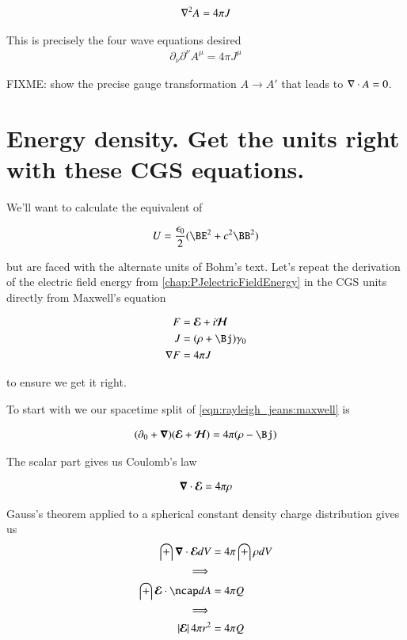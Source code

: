 \begin{align*}
\nabla^2 A = 4 \pi J
\end{align*}

This is precisely the four wave equations desired
\begin{align*}
\partial_\nu\partial^\nu A^\mu = 4 \pi J^\mu
\end{align*}

FIXME: show the precise gauge transformation $A \rightarrow A'$ that leads to $\nabla \cdot A = 0$.

\section{Energy density.  Get the units right with these CGS equations. }

We'll want to calculate the equivalent of 

\begin{align*}
U = \frac{\epsilon_0}{2} (\BE^2 + c^2 \BB^2)
\end{align*}

but are faced with the alternate units of Bohm's text.  Let's repeat the
derivation of the electric field energy from \ref{chap:PJelectricFieldEnergy}
in the CGS units directly from Maxwell's equation

\begin{align}\label{eqn:rayleigh_jeans:maxwell}
F &= \EE + i\HH \\
J &= (\rho + \Bj) \gamma_0 \\
\grad F &= 4 \pi J
\end{align}

to ensure we get it right.

To start with we our spacetime split of \ref{eqn:rayleigh_jeans:maxwell} is

\begin{align*}
( \partial_0 + \spacegrad ) (\EE + \HH) = 4 \pi (\rho - \Bj)
\end{align*}

The scalar part gives us Coulomb's law

\begin{align}
\boldsymbol{\nabla} \cdot \boldsymbol{\mathcal{E}} = 4 \pi \rho 
\end{align}

Gauss's theorem applied to a spherical constant density charge distribution
gives us
\begin{align*}
\int \spacegrad \cdot \EE dV &= 4 \pi \int \rho dV \\
\implies \\
\int {\EE} \cdot \ncap dA &= 4 \pi Q \\
\implies \\
\Abs{\EE} 4 \pi r^2 &= 4 \pi Q \\
\end{align*}

